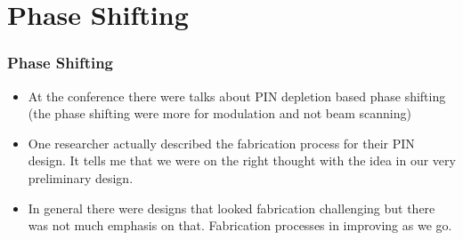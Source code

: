 \documentclass{beamer}
\begin{document}
\section{Phase Shifting} 
\begin{frame}
\frametitle{Phase Shifting}
\begin{itemize}
\item  At the conference there were talks about PIN depletion based phase shifting (the phase shifting were more for modulation and not beam scanning)
\item One researcher actually described the fabrication process for their PIN design. It tells me that we were on the right thought with the idea in our very preliminary design. 
\item In general there were designs that looked fabrication challenging but there was not much emphasis on that. Fabrication processes in improving as we go.
\end{itemize}
\end{frame}
%
\end{document}
